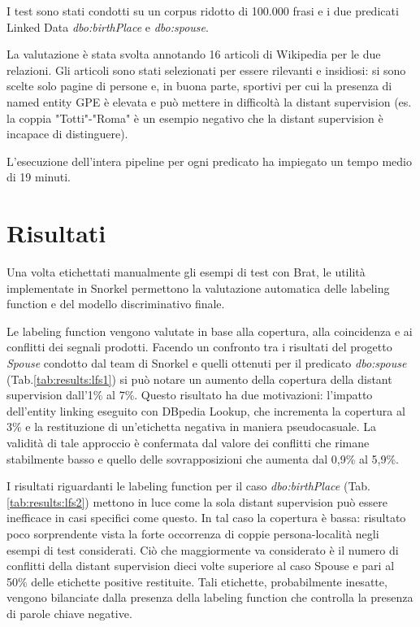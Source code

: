 I test sono stati condotti su un corpus ridotto di 100.000 frasi e i due predicati Linked Data \textit{dbo:birthPlace} e \textit{dbo:spouse}. 

La valutazione è stata svolta annotando 16 articoli di Wikipedia per le due relazioni. Gli articoli sono stati selezionati per essere rilevanti e insidiosi: si sono scelte solo pagine di persone e, in buona parte, sportivi per cui la presenza di named entity GPE è elevata e può mettere in difficoltà la distant supervision (es. la coppia "Totti"-"Roma" è un esempio negativo che la distant supervision è incapace di distinguere).

L'esecuzione dell'intera pipeline per ogni predicato ha impiegato un tempo medio di 19 minuti.



\section{Risultati}
\label{sec:results:results}

Una volta etichettati manualmente gli esempi di test con Brat, le utilità implementate in Snorkel permettono la valutazione automatica delle labeling function e del modello discriminativo finale.

Le labeling function vengono valutate in base alla copertura, alla coincidenza e ai conflitti dei segnali prodotti.
Facendo un confronto tra i risultati del progetto \textit{Spouse} condotto dal team di Snorkel \cite{snorkel_spouse_result_lfs} e quelli ottenuti per il predicato \textit{dbo:spouse} (Tab.\ref{tab:results:lfs1}) si può notare un aumento della copertura della distant supervision dall'1\% al 7\%. Questo risultato ha due motivazioni: l'impatto dell'entity linking eseguito con DBpedia Lookup, che incrementa la copertura al 3\% e la restituzione di un'etichetta negativa in maniera pseudocasuale. La validità di tale approccio è confermata dal valore dei conflitti che rimane stabilmente basso e quello delle sovrapposizioni che aumenta dal 0,9\% al 5,9\%.

I risultati riguardanti le labeling function per il caso \textit{dbo:birthPlace} (Tab. \ref{tab:results:lfs2}) mettono in luce come la sola distant supervision può essere inefficace in casi specifici come questo. In tal caso la copertura è bassa: risultato poco sorprendente vista la forte occorrenza di coppie persona-località negli esempi di test considerati. Ciò che maggiormente va considerato è il numero di conflitti della distant supervision dieci volte superiore al caso Spouse e pari al 50\% delle etichette positive restituite. Tali etichette, probabilmente inesatte, vengono bilanciate dalla presenza della labeling function che controlla la presenza di parole chiave negative.

